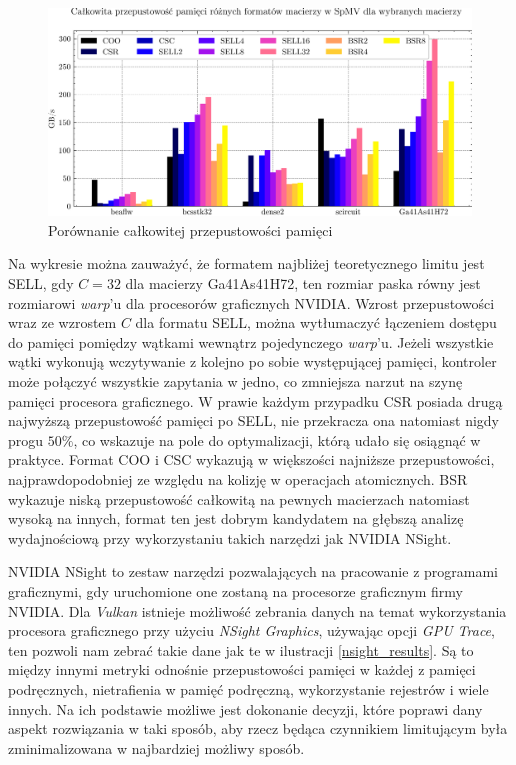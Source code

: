 \begin{figure}[!htb]
    \centering
    \includegraphics[width=\linewidth]{result_plots/barchart_memory_absolute_tput.png}
    \caption{Porównanie całkowitej przepustowości pamięci}\label{absolute_tput}
\end{figure}

Na wykresie można zauważyć, że formatem najbliżej teoretycznego limitu jest SELL, gdy $C = 32$ dla macierzy Ga41As41H72, ten rozmiar paska równy jest rozmiarowi \textit{warp}'u dla procesorów graficznych NVIDIA.
Wzrost przepustowości wraz ze wzrostem $C$ dla formatu SELL, można wytłumaczyć łączeniem dostępu do pamięci pomiędzy wątkami wewnątrz pojedynczego \textit{warp}'u.
Jeżeli wszystkie wątki wykonują wczytywanie z kolejno po sobie występującej pamięci, kontroler może połączyć wszystkie zapytania w jedno, co zmniejsza narzut na szynę pamięci procesora graficznego.
W prawie każdym przypadku CSR posiada drugą najwyższą przepustowość pamięci po SELL, nie przekracza ona natomiast nigdy progu $50\%$, co wskazuje na pole do optymalizacji, którą udało się osiągnąć w praktyce\cite{AMD_CSR_opt}.
Format COO i CSC wykazują w większości najniższe przepustowości, najprawdopodobniej ze względu na kolizję w operacjach atomicznych.
BSR wykazuje niską przepustowość całkowitą na pewnych macierzach natomiast wysoką na innych, format ten jest dobrym kandydatem na głębszą analizę wydajnościową przy wykorzystaniu takich narzędzi jak NVIDIA NSight.

NVIDIA NSight to zestaw narzędzi pozwalających na pracowanie z programami graficznymi, gdy uruchomione one zostaną na procesorze graficznym firmy NVIDIA.
Dla \textit{Vulkan} istnieje możliwość zebrania danych na temat wykorzystania procesora graficznego przy użyciu \textit{NSight Graphics}\cite{nsight}, używając opcji \textit{GPU Trace}, ten pozwoli nam zebrać takie dane jak te w ilustracji \ref{nsight_results}.
Są to między innymi metryki odnośnie przepustowości pamięci w każdej z pamięci podręcznych, nietrafienia w pamięć podręczną, wykorzystanie rejestrów i wiele innych.
Na ich podstawie możliwe jest dokonanie decyzji, które poprawi dany aspekt rozwiązania w taki sposób, aby rzecz będąca czynnikiem limitującym była zminimalizowana w najbardziej możliwy sposób.


